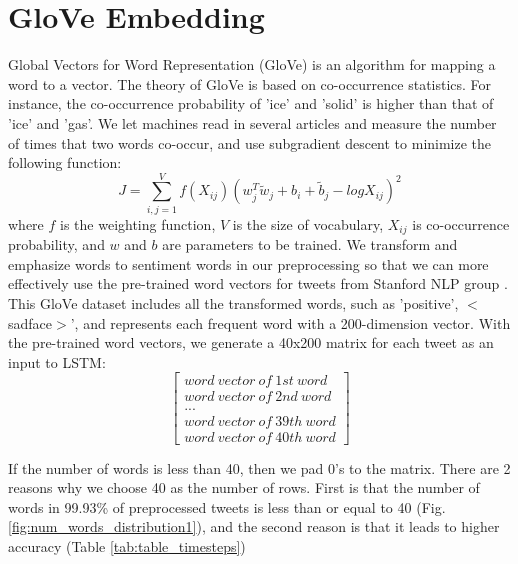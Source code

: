 \documentclass[10pt,conference,compsocconf]{IEEEtran}
\begin{document}
\section{GloVe Embedding}
Global Vectors for Word Representation (GloVe) \cite{GloVe} is an algorithm for mapping a word to a vector. The theory of GloVe is based on co-occurrence statistics. For instance, the co-occurrence probability of 'ice' and 'solid' is higher than that of 'ice' and 'gas'. We let machines read in several articles and measure the number of times that two words co-occur, and use subgradient descent to minimize the following function:
$$J = \sum_{i,j=1}^{V}{f(X_{ij})(w_j^T\tilde{w}_j + b_i + \tilde{b}_j - logX_{ij})^2}$$
where $f$ is the weighting function, $V$ is the size of vocabulary, $X_{ij}$ is co-occurrence probability, and $w$ and $b$ are parameters to be trained. We transform and emphasize words to sentiment words in our preprocessing so that we can more effectively use the pre-trained word vectors for tweets from Stanford NLP group \cite{GloVetweet}. This GloVe dataset includes all the transformed words, such as 'positive', $<$sadface$>$', and represents each frequent word with a 200-dimension vector. With the pre-trained word vectors, we generate a 40x200 matrix for each tweet as an input to LSTM:
$$\begin{bmatrix}
word \  vector \  of \  1st \  word \\
word \  vector \  of \  2nd \  word \\
... \\
word \  vector \  of \  39th \  word \\
word \  vector \  of \  40th \  word 
\end{bmatrix}$$

If the number of words is less than 40, then we pad 0's to the matrix. There are 2 reasons why we choose 40 as the number of rows. First is that the number of words in 99.93\% of preprocessed tweets is less than or equal to 40 (Fig. \ref{fig:num_words_distribution1}), and the second reason is that it leads to higher accuracy (Table \ref{tab:table_timesteps})
\end{document}
